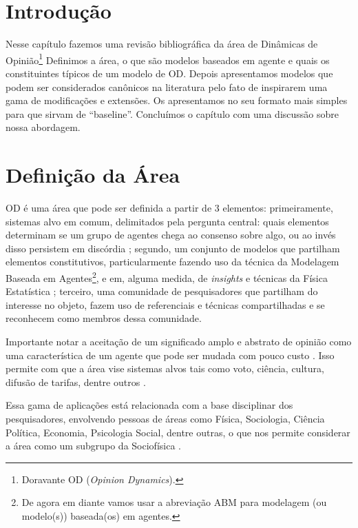 \section{Introdução}

Nesse capítulo fazemos uma revisão bibliográfica da área de Dinâmicas de
Opinião\footnote{Doravante OD (\textit{Opinion Dynamics}).} Definimos a área, o
que são modelos baseados em agente e quais os constituintes típicos de um modelo
de OD. Depois apresentamos modelos que podem ser considerados canônicos na
literatura  pelo fato de inspirarem uma gama de modificações e extensões. Os
apresentamos no seu formato mais simples para que sirvam de ``baseline''.
Concluímos o capítulo com uma discussão sobre nossa abordagem.


\section{Definição da Área}

OD é uma área que pode ser definida a partir de 3 elementos: primeiramente,
sistemas alvo em comum, delimitados pela pergunta central: quais elementos
determinam se um grupo de agentes chega ao consenso sobre algo, ou ao invés
disso persistem em discórdia \cite{castellano2012social} ; segundo, um conjunto
de modelos que partilham elementos constitutivos, particularmente fazendo uso da
técnica da Modelagem Baseada em Agentes\footnote{De agora em diante vamos usar a
  abreviação ABM para modelagem (ou modelo(s)) baseada(os) em agentes.}, e em,
alguma medida, de \textit{insights} e técnicas da Física Estatística
\cite{galam1990social}; terceiro, uma comunidade de pesquisadores que partilham
do interesse no objeto, fazem uso de referenciais e técnicas compartilhadas e se
reconhecem como membros dessa comunidade.

Importante notar a aceitação de um significado amplo e abstrato de opinião como
uma característica de um agente que pode ser mudada com pouco custo
\cite[p.312]{castellano2012social}. Isso permite com que a área vise sistemas
alvos tais como voto, ciência, cultura, difusão de tarifas, dentre
outros
\cite{kowalska2013going,martins2015thou,axelrod1997dissemination,galam1990social}.

Essa gama de aplicações está relacionada com a base disciplinar dos pesquisadores,
envolvendo pessoas de áreas como Física, Sociologia, Ciência Política, Economia,
Psicologia Social, dentre outras, o que nos permite considerar a área como um
subgrupo da Sociofísica \cite{galam1982sociophysics,galam2012sociophysics}.


